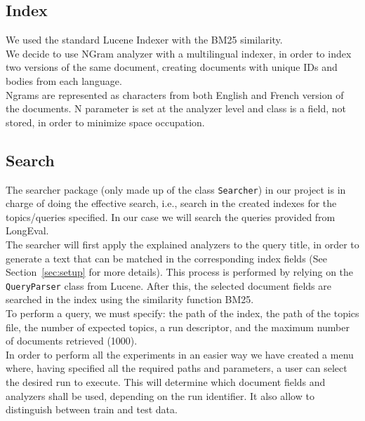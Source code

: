 \subsection{Index}\label{subsec:index}
We used the standard Lucene Indexer with the BM25\cite{BM25} similarity.\\
We decide to use NGram analyzer with a multilingual indexer,
in order to index two versions of the same document, creating documents with
unique IDs and bodies from each language.\\
Ngrams are represented as characters from both English and French version of
the documents. N parameter is set at the analyzer level and class is a field,
not stored, in order to minimize space occupation.\\

\subsection{Search}\label{subsec:search}
The searcher package (only made up of the class \texttt{Searcher}) in our project is in charge of doing the effective
search, i.e., search in the created indexes for the topics/queries specified.
In our case we will search the queries provided from LongEval\cite{traindata}.\\
The searcher will first apply the explained analyzers to the query title, in order to generate a text that can be
matched in the corresponding index fields (See Section~\ref{sec:setup} for more details).
This process is performed by relying on the \texttt{QueryParser} class from Lucene.
After this, the selected document fields are searched in the index using the similarity function BM25\cite{BM25}.\\
To perform a query, we must specify: the path of the index, the path of the topics file, the number of expected topics,
a run descriptor, and the maximum number of documents retrieved (1000).\\
In order to perform all the experiments in an easier way we have created a menu where, having specified all the required
paths and parameters, a user can select the desired run to execute.
This will determine which document fields and analyzers shall be used, depending on the run identifier.
It also allow to distinguish between train and test data.\\

